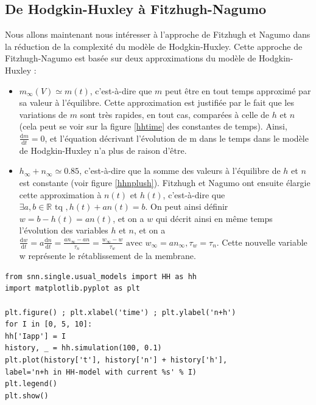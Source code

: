 \documentclass[12pt]{scrartcl}
\newcommand{\dd}{\mathrm{d}}
\begin{document}
\subsection{De Hodgkin-Huxley à Fitzhugh-Nagumo}
Nous allons maintenant nous intéresser à l'approche de Fitzhugh et Nagumo dans la réduction de la complexité du modèle de Hodgkin-Huxley. Cette approche de Fitzhugh-Nagumo est basée sur deux approximations du modèle de Hodgkin-Huxley : 
\begin{itemize}
\item $m_{\infty}(V) \simeq m(t)$, c'est-à-dire que $m$ peut être en tout temps approximé par sa valeur à l'équilibre. Cette approximation est justifiée par le fait que les variations de $m$ sont très rapides, en tout cas, comparées à celle de $h$ et $n$ (cela peut se voir sur la figure \ref{hhtime} des constantes de temps). Ainsi, $\frac{\dd m}{\dd t} = 0$, et l'équation décrivant l'évolution de m dans le temps dans le modèle de Hodgkin-Huxley n'a plus de raison d'être.
\item $h_\infty + n_\infty \simeq 0.85$, c'est-à-dire que la somme des valeurs à l'équilibre de $h$ et $n$ est constante (voir figure \ref{hhnplush}). Fitzhugh et Nagumo ont ensuite élargie cette approximation à $n(t)$ et $h(t)$, c'est-à-dire que $\exists a,b \in \mathbb{R} \text{ tq }, h(t) + an(t) = b$. On peut ainsi définir $w = b-h(t) = an(t)$, et on a $w$ qui décrit ainsi en même temps l'évolution des variables $h$ et $n$, et on a $\displaystyle \frac{\dd w}{\dd t} = a\frac{\dd n}{\dd t} = \frac{an_\infty -an}{\tau_n} = \frac{w_\infty-w}{\tau_w} \text{ avec } w_\infty=an_\infty, \tau_w = \tau_n$. Cette nouvelle variable w représente le rétablissement de la membrane. \end{itemize}

\begin{lstlisting}[caption = {Hodgkin-Huxley : Somme de n et h}]
from snn.single.usual_models import HH as hh
import matplotlib.pyplot as plt

plt.figure() ; plt.xlabel('time') ; plt.ylabel('n+h')
for I in [0, 5, 10]:
hh['Iapp'] = I
history, _ = hh.simulation(100, 0.1)
plt.plot(history['t'], history['n'] + history['h'], 
label='n+h in HH-model with current %s' % I)
plt.legend()
plt.show()
\end{lstlisting}
\end{document}
